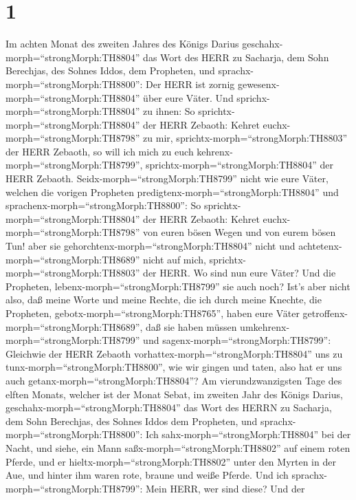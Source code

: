 \hypertarget{section}{%
\section{1}\label{section}}

 Im achten Monat des zweiten Jahres des Königs Darius
geschahx-morph=``strongMorph:TH8804'' das Wort des HERR zu Sacharja, dem
Sohn Berechjas, des Sohnes Iddos, dem Propheten, und
sprachx-morph=``strongMorph:TH8800'':  Der HERR ist zornig
gewesenx-morph=``strongMorph:TH8804'' über eure Väter.  Und
sprichx-morph=``strongMorph:TH8804'' zu ihnen: So
sprichtx-morph=``strongMorph:TH8804'' der HERR Zebaoth: Kehret
euchx-morph=``strongMorph:TH8798'' zu mir,
sprichtx-morph=``strongMorph:TH8803'' der HERR Zebaoth, so will ich mich
zu euch kehrenx-morph=``strongMorph:TH8799'',
sprichtx-morph=``strongMorph:TH8804'' der HERR Zebaoth. 
Seidx-morph=``strongMorph:TH8799'' nicht wie eure Väter, welchen die
vorigen Propheten predigtenx-morph=``strongMorph:TH8804'' und
sprachenx-morph=``strongMorph:TH8800'': So
sprichtx-morph=``strongMorph:TH8804'' der HERR Zebaoth: Kehret
euchx-morph=``strongMorph:TH8798'' von euren bösen Wegen und von eurem
bösen Tun! aber sie gehorchtenx-morph=``strongMorph:TH8804'' nicht und
achtetenx-morph=``strongMorph:TH8689'' nicht auf mich,
sprichtx-morph=``strongMorph:TH8803'' der HERR.  Wo sind nun
eure Väter? Und die Propheten, lebenx-morph=``strongMorph:TH8799'' sie
auch noch?  Ist's aber nicht also, daß meine Worte und meine
Rechte, die ich durch meine Knechte, die Propheten,
gebotx-morph=``strongMorph:TH8765'', haben eure Väter
getroffenx-morph=``strongMorph:TH8689'', daß sie haben müssen
umkehrenx-morph=``strongMorph:TH8799'' und
sagenx-morph=``strongMorph:TH8799'': Gleichwie der HERR Zebaoth
vorhattex-morph=``strongMorph:TH8804'' uns zu
tunx-morph=``strongMorph:TH8800'', wie wir gingen und taten, also hat er
uns auch getanx-morph=``strongMorph:TH8804''?  Am
vierundzwanzigsten Tage des elften Monats, welcher ist der Monat Sebat,
im zweiten Jahr des Königs Darius, geschahx-morph=``strongMorph:TH8804''
das Wort des HERRN zu Sacharja, dem Sohn Berechjas, des Sohnes Iddos dem
Propheten, und sprachx-morph=``strongMorph:TH8800'':  Ich
sahx-morph=``strongMorph:TH8804'' bei der Nacht, und siehe, ein Mann
saßx-morph=``strongMorph:TH8802'' auf einem roten Pferde, und er
hieltx-morph=``strongMorph:TH8802'' unter den Myrten in der Aue, und
hinter ihm waren rote, braune und weiße Pferde.  Und ich
sprachx-morph=``strongMorph:TH8799'': Mein HERR, wer sind diese? Und der
